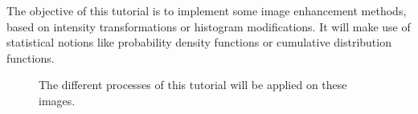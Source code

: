 \def\difficulty{2}
\label{tutorial:image_enhancement}

\begin{note}The objective of this tutorial is to implement some image enhancement methods, based on intensity transformations or histogram modifications. It will make use of statistical notions like probability density functions or cumulative distribution functions.\end{note}

\begin{figure}[H]
\centering\caption{The different processes of this tutorial will be applied on these images.}%
\hfill
{}%
\vspace*{-10pt}%
\label{fig:image_enhancement:enonce:examples}%
\end{figure}


